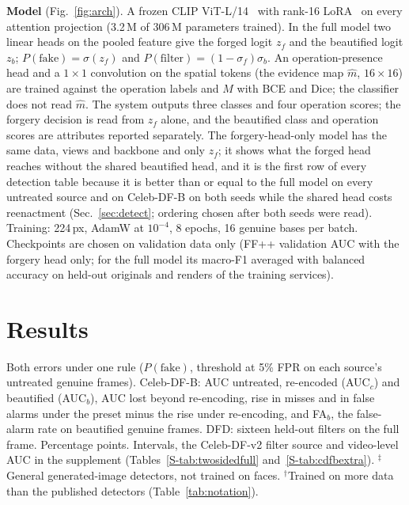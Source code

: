 \documentclass[conference]{IEEEtran}
\begin{document}
\textbf{Model} (Fig.~\ref{fig:arch}). A frozen CLIP ViT-L/14~\cite{clip} with rank-16 LoRA~\cite{lora} on every attention projection (3.2\,M of
306\,M parameters trained). In the full model two linear heads on the pooled feature give the forged logit $z_f$ and the
beautified logit $z_b$; $P(\text{fake})=\sigma(z_f)$ and $P(\text{filter})=(1-\sigma_f)\sigma_b$. An operation-presence head
and a $1\times1$ convolution on the spatial tokens (the evidence map $\hat m$, $16\times16$) are trained against the operation
labels and $M$ with BCE and Dice; the classifier does not read $\hat m$. The system outputs three classes and four operation
scores; the forgery decision is read from $z_f$ alone, and the beautified class and operation scores are attributes reported
separately. The forgery-head-only model has the same data, views and backbone and only $z_f$; it shows what the forged head
reaches without the shared beautified head, and it is the first row of every detection table because it is better than or equal
to the full model on every untreated source and on Celeb-DF-B on both seeds while the shared head costs reenactment
(Sec.~\ref{sec:detect}; ordering chosen after both seeds were read). Training: 224\,px, AdamW at $10^{-4}$, 8 epochs, 16 genuine
bases per batch. Checkpoints are chosen on validation data only (FF++ validation AUC with the forgery head only; for the full
model its macro-F1 averaged with balanced accuracy on held-out originals and renders of the training services).

\section{Results}
\label{sec:results}
\begin{table}[t]
\centering
\caption{Both errors under one rule ($P(\text{fake})$, threshold at 5\% FPR on each source's untreated genuine frames).
Celeb-DF-B: AUC untreated, re-encoded (AUC$_c$) and beautified (AUC$_b$), AUC lost beyond re-encoding, rise in misses and in
false alarms under the preset minus the rise under re-encoding, and FA$_b$, the false-alarm rate on beautified genuine frames.
DFD: sixteen held-out filters on the full frame. Percentage points. Intervals, the Celeb-DF-v2 filter source and video-level
AUC in the supplement (Tables~\ref{S-tab:twosidedfull} and~\ref{S-tab:cdfbextra}). $^\ddagger$General generated-image detectors,
not trained on faces. $^\dagger$Trained on more data than the published detectors (Table~\ref{tab:notation}).}
\label{tab:twosided}
\scriptsize
\setlength{\tabcolsep}{3pt}
\begin{adjustbox}{max width=\textwidth}\end{adjustbox}
\end{table}
\end{document}
